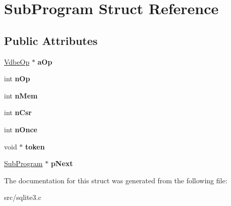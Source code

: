 \hypertarget{struct_sub_program}{\section{Sub\-Program Struct Reference}
\label{struct_sub_program}
}
\subsection*{Public Attributes}
\begin{DoxyCompactItemize}
\item 
\hypertarget{struct_sub_program_aa9bb1992fed633d182076a35d6448c7d}{\hyperlink{struct_vdbe_op}{Vdbe\-Op} $\ast$ {\bfseries a\-Op}}\label{struct_sub_program_aa9bb1992fed633d182076a35d6448c7d}

\item 
\hypertarget{struct_sub_program_a6fe204a75ab8254c453be77f024b6d69}{int {\bfseries n\-Op}}\label{struct_sub_program_a6fe204a75ab8254c453be77f024b6d69}

\item 
\hypertarget{struct_sub_program_a9bece42fdeb81085809d7c2f8aa05616}{int {\bfseries n\-Mem}}\label{struct_sub_program_a9bece42fdeb81085809d7c2f8aa05616}

\item 
\hypertarget{struct_sub_program_a83b18aa5cc63aecdbf996c16af1e48bb}{int {\bfseries n\-Csr}}\label{struct_sub_program_a83b18aa5cc63aecdbf996c16af1e48bb}

\item 
\hypertarget{struct_sub_program_a907d5933dd0149be1ef90fcbe91e3c58}{int {\bfseries n\-Once}}\label{struct_sub_program_a907d5933dd0149be1ef90fcbe91e3c58}

\item 
\hypertarget{struct_sub_program_aaea3b67899b092476b107d22a4e2022d}{void $\ast$ {\bfseries token}}\label{struct_sub_program_aaea3b67899b092476b107d22a4e2022d}

\item 
\hypertarget{struct_sub_program_a7da35488ac58a64fa30b88da56aac8b3}{\hyperlink{struct_sub_program}{Sub\-Program} $\ast$ {\bfseries p\-Next}}\label{struct_sub_program_a7da35488ac58a64fa30b88da56aac8b3}

\end{DoxyCompactItemize}


The documentation for this struct was generated from the following file\-:\begin{DoxyCompactItemize}
\item 
src/sqlite3.\-c\end{DoxyCompactItemize}
